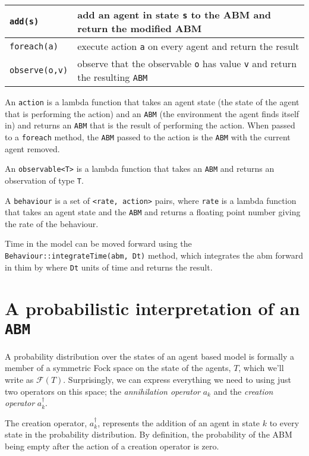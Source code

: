 \documentclass[letterpaper,twocolumn,10pt]{article}
\begin{document}
\begin{tabular}{|l|p{4.9cm}|}
\hline
\texttt{add(s)} & add an agent in state \texttt{s} to the ABM and return the modified ABM\\
\hline
\texttt{foreach(a)} & execute action \texttt{a} on every agent and return the result\\
\hline
\texttt{observe(o,v)} & observe that the observable \texttt{o} has value \texttt{v} and return the resulting \texttt{ABM}\\
\hline
\end{tabular}

An \texttt{action} is a lambda function that takes an agent state (the state of the agent that is performing the action) and an \texttt{ABM} (the environment the agent finds itself in) and returns an \texttt{ABM} that is the result of performing the action. When passed to a \texttt{foreach} method, the \texttt{ABM} passed to the action is the \texttt{ABM} with the current agent removed.

An \texttt{observable<T>} is a lambda function that takes an \texttt{ABM} and returns an observation of type \texttt{T}.

A \texttt{behaviour} is a set of \texttt{<rate, action>} pairs, where \texttt{rate} is a lambda function that takes an agent state and the \texttt{ABM} and returns a floating point number giving the rate of the behaviour.

Time in the model can be moved forward using the \texttt{Behaviour::integrateTime(abm, Dt)} method, which integrates the abm forward in thim by where \texttt{Dt} units of time and returns the result.


\section{A probabilistic interpretation of an \texttt{ABM}}

A probability distribution over the states of an agent based model is formally a member of a symmetric Fock space on the state of the agents, $T$, which we'll write as $\mathcal{F}(T)$. Surprisingly, we can express everything we need to using just two operators on this space; the \textit{annihilation operator} $a_k$ and the \textit{creation operator} $a_k^\dag$.

The creation operator, $a_k^\dag$, represents the addition of an agent in state $k$ to every state in the probability distribution. By definition, the probability of the ABM being empty after the action of a creation operator is zero.
\end{document}

